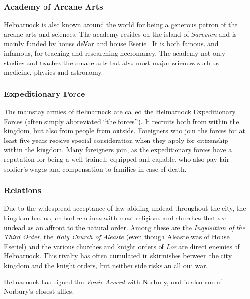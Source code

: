 \subsubsection*{Academy of Arcane Arts}

Helmarnock is also known around the world for being a generous patron of the
arcane arts and sciences. The academy resides on the island of \emph{Saremen}
and is mainly funded by house de\'Var and house Eseriel. It is both famous,
and infamous, for teaching and researching necromancy. The academy not only
studies and teaches the arcane arts but also most major sciences such as
medicine, physics and astronomy.

\subsubsection*{Expeditionary Force}

The mainstay armies of Helmarnock are called the Helmarnock Expeditionary
Forces (often simply abbreviated ``the forces''). It recruits both from
within the kingdom, but also from people from outside. Foreigners who join the
forces for at least five years receive special consideration when they apply for
citizenship within the kingdom. Many foreigners join, as the expeditionary
forces have a reputation for being a well trained, equipped and capable, who
also pay fair soldier's wages and compensation to families in case of death.

\subsubsection*{Relations}

Due to the widespread acceptance of law-abiding undead throughout the city, the
kingdom has no, or bad relations with most religions and churches that see
undead as an affront to the natural order. Among these are the
\emph{Inquisition of the Third Order}, the \emph{Holy Church of Aleaste} (even
though Aleaste was of House Eseriel) and the various churches and knight
orders of \emph{Lor} are direct enemies of Helmarnock. This rivalry has often
cumulated in skirmishes between the city kingdom and the knight orders, but
neither side risks an all out war.

Helmarnock has signed the \emph{Vonir Accord} with Norbury, and is also one
of Norbury's closest allies.
